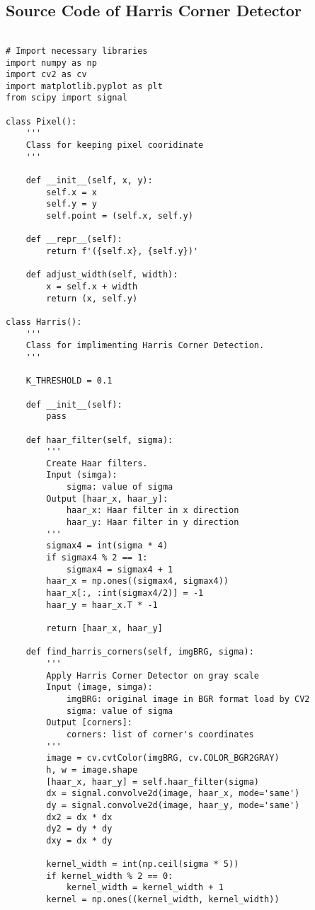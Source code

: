 \documentclass[11pt]{article}
\begin{document}
\subsection*{Source Code of Harris Corner Detector}

\begin{lstlisting}

# Import necessary libraries
import numpy as np
import cv2 as cv
import matplotlib.pyplot as plt
from scipy import signal 

class Pixel():
    '''
    Class for keeping pixel cooridinate
    '''

    def __init__(self, x, y):
        self.x = x
        self.y = y
        self.point = (self.x, self.y)

    def __repr__(self):
        return f'({self.x}, {self.y})'

    def adjust_width(self, width):
        x = self.x + width
        return (x, self.y)

class Harris():
    '''
    Class for implimenting Harris Corner Detection.
    '''

    K_THRESHOLD = 0.1
    
    def __init__(self):
        pass

    def haar_filter(self, sigma):
        '''
        Create Haar filters.
        Input (simga):
            sigma: value of sigma
        Output [haar_x, haar_y]:
            haar_x: Haar filter in x direction
            haar_y: Haar filter in y direction
        '''
        sigmax4 = int(sigma * 4)
        if sigmax4 % 2 == 1:
            sigmax4 = sigmax4 + 1
        haar_x = np.ones((sigmax4, sigmax4))
        haar_x[:, :int(sigmax4/2)] = -1
        haar_y = haar_x.T * -1

        return [haar_x, haar_y]

    def find_harris_corners(self, imgBRG, sigma):
        '''
        Apply Harris Corner Detector on gray scale
        Input (image, simga):
            imgBRG: original image in BGR format load by CV2
            sigma: value of sigma
        Output [corners]:
            corners: list of corner's coordinates
        '''
        image = cv.cvtColor(imgBRG, cv.COLOR_BGR2GRAY)
        h, w = image.shape
        [haar_x, haar_y] = self.haar_filter(sigma)
        dx = signal.convolve2d(image, haar_x, mode='same')
        dy = signal.convolve2d(image, haar_y, mode='same')
        dx2 = dx * dx
        dy2 = dy * dy
        dxy = dx * dy

        kernel_width = int(np.ceil(sigma * 5))
        if kernel_width % 2 == 0:
            kernel_width = kernel_width + 1
        kernel = np.ones((kernel_width, kernel_width))
        

\end{lstlisting}
\end{document}
